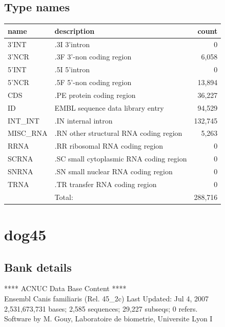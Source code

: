 \documentclass{article}
\begin{document}
\begin{Schunk}
\subsection{Type names}
\noindent\begin{tabular}{llr}
\hline \hline
name & description & count \\
\hline
3'INT  &  .3I 3'intron  &  0 \\
3'NCR  &  .3F  3'-non coding region  &  6,058 \\
5'INT  &  .5I 5'intron  &  0 \\
5'NCR  &  .5F  5'-non coding region  &  13,894 \\
CDS  &  .PE protein coding region  &  36,227 \\
ID  &  EMBL sequence data library entry  &  94,529 \\
INT\_INT  &  .IN  internal intron  &  132,745 \\
MISC\_RNA  &  .RN other structural RNA coding region  &  5,263 \\
RRNA  &  .RR ribosomal RNA coding region  &  0 \\
SCRNA  &  .SC small cytoplasmic RNA coding region  &  0 \\
SNRNA  &  .SN small nuclear RNA coding region  &  0 \\
TRNA  &  .TR transfer RNA coding region  &  0 \\
\hline
 & Total: & 288,716 \\
\hline \hline
\end{tabular}

\section{ dog45 }
\subsection{Bank details}
             ****     ACNUC Data Base Content      ****                         \\
       Ensembl Canis familiaris  (Rel. 45\_2c) Last Updated: Jul  4, 2007\\
2,531,673,731 bases; 2,585 sequences; 29,227 subseqs; 0 refers.\\
Software by M. Gouy, Laboratoire de biometrie, Universite Lyon I 


\end{Schunk}
\end{document}
